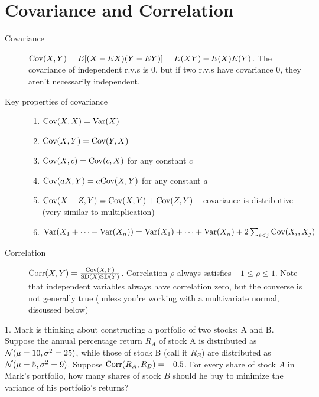\documentclass{article}
\begin{document}
 

\header

\section{Covariance and Correlation}

\begin{description}

\item[Covariance] $\textrm{Cov}(X, Y) = E[(X - EX)(Y - EY)] = E(XY) - E(X)E(Y)$. The covariance of independent r.v.s is 0, but if two r.v.s have covariance 0, they aren't necessarily independent.

\item[Key properties of covariance]

    \begin{enumerate}
        \item $\textrm{Cov}(X, X) = \textrm{Var}(X)$
        
        \item $\textrm{Cov}(X, Y) = \textrm{Cov}(Y, X)$
        
        \item $\textrm{Cov}(X, c) = \textrm{Cov}(c, X)$ for any constant $c$
        
        \item $\textrm{Cov}(aX, Y) = a\textrm{Cov}(X, Y)$ for any constant $a$
        
        \item $\textrm{Cov}(X + Z, Y) = \textrm{Cov}(X, Y) + \textrm{Cov}(Z, Y)$ -- covariance is distributive (very similar to multiplication)
        
        \item $\textrm{Var}(X_1 + \dots + \textrm{Var}(X_n)) = \textrm{Var}(X_1) + \dots + \textrm{Var}(X_n) + 2\sum_{i < j} \textrm{Cov}(X_i, X_j)$
    \end{enumerate}

\item[Correlation] $\textrm{Corr}(X, Y) = \frac{\textrm{Cov}(X, Y)}{\textrm{SD}(X)\textrm{SD}(Y)}$. Correlation $\rho$ always satisfies $-1 \leq \rho \leq 1$. Note that independent variables always have correlation zero, but the converse is not generally true (unless you're working with a multivariate normal, discussed below)

\end{description}

1. Mark is thinking about constructing a portfolio of two stocks: A and B. Suppose the annual percentage return $R_A$ of stock A is distributed as $\mathcal{N}(\mu=10, \sigma^2=25)$, while those of stock B (call it $R_B$) are distributed as $\mathcal{N}(\mu=5, \sigma^2=9)$. Suppose $\textrm{Corr}(R_A,R_B) = -0.5$. For every share of stock $A$ in Mark's portfolio, how many shares of stock $B$ should he buy to minimize the variance of his portfolio's returns?
\end{document}
